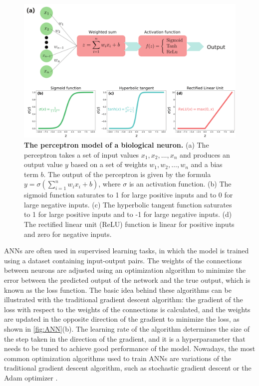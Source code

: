 \begin{figure}[H]
  \centering
  \includegraphics[width=\textwidth]{Figures/Perceptron.pdf}
  \caption[The perceptron model of a biological neuron]{
    \textbf{The perceptron model of a biological neuron.} (a) The perceptron
    takes a set of input values $x_1, x_2, \ldots, x_n$ and produces an
    output
    value $y$ based on a set of weights $w_1, w_2, \ldots, w_n$ and a bias
    term
    $b$. The output of the perceptron is given by the formula
    $y=\sigma(\sum_{i=1}^n w_ix_i + b)$, where $\sigma$ is an activation
    function. (b) The sigmoid function saturates to 1 for large positive
    inputs
    and to 0 for large negative inputs. (c) The hyperbolic tangent function
    saturates to 1 for large positive inputs and to -1 for large negative
    inputs. (d) The rectified linear unit (ReLU) function is linear for
    positive inputs and zero for negative inputs.}
  \label{fig:Perceptron}
\end{figure}

ANNs are often used in supervised learning tasks, in which the model is
trained
using a dataset containing input-output pairs. The weights of the connections
between neurons are adjusted using an optimization algorithm to minimize the
error between the predicted output of the network and the true output, which
is
known as the loss function. The basic idea behind these algorithms can be
illustrated with the traditional gradient descent algorithm: the gradient of
the loss with respect to the weights of the connections is calculated, and
the
weights are updated in the opposite direction of the gradient to minimize the
loss, as shown in \cref{fig:ANN}(b). The learning rate of the algorithm
determines the size of the step taken in the direction of the gradient, and
it
is a hyperparameter that needs to be tuned to achieve good performance of the
model. Nowadays, the most common optimization algorithms used to train ANNs
are
variations of the traditional gradient descent algorithm, such as stochastic
gradient descent or the Adam optimizer \cite{Goodfellow2016}.

